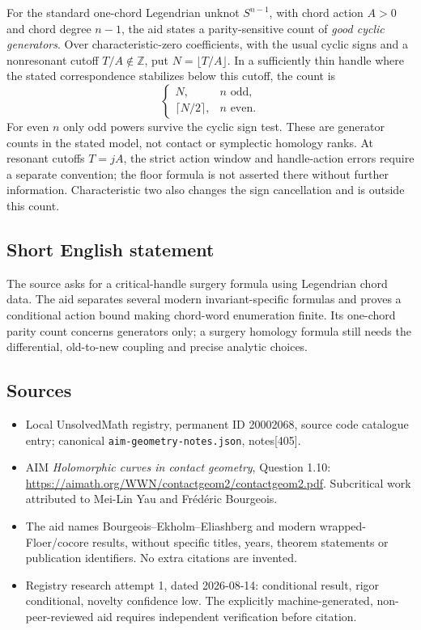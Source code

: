 \documentclass[11pt]{article}
\newcommand{\Z}{\mathbb{Z}}
\begin{document}
For the standard one-chord Legendrian unknot $S^{n-1}$, with chord action $A>0$ and chord degree $n-1$, the aid states a parity-sensitive count of \emph{good cyclic generators}. Over characteristic-zero coefficients, with the usual cyclic signs and a nonresonant cutoff $T/A\notin\Z$, put $N=\lfloor T/A\rfloor$. In a sufficiently thin handle where the stated correspondence stabilizes below this cutoff, the count is
\[
 \begin{cases}
 N,&n\text{ odd},\\
 \lceil N/2\rceil,&n\text{ even}.
 \end{cases}
\]
For even $n$ only odd powers survive the cyclic sign test. These are generator counts in the stated model, not contact or symplectic homology ranks. At resonant cutoffs $T=jA$, the strict action window and handle-action errors require a separate convention; the floor formula is not asserted there without further information. Characteristic two also changes the sign cancellation and is outside this count.
\subsection{Short English statement}
The source asks for a critical-handle surgery formula using Legendrian chord data. The aid separates several modern invariant-specific formulas and proves a conditional action bound making chord-word enumeration finite. Its one-chord parity count concerns generators only; a surgery homology formula still needs the differential, old-to-new coupling and precise analytic choices.
\subsection{Sources}
\begin{itemize}
\item Local UnsolvedMath registry, permanent ID 20002068, source code catalogue entry; canonical \texttt{aim-geometry-notes.json}, notes[405].
\item AIM \emph{Holomorphic curves in contact geometry}, Question 1.10: \url{https://aimath.org/WWN/contactgeom2/contactgeom2.pdf}. Subcritical work attributed to Mei-Lin Yau and Fr\'ed\'eric Bourgeois.
\item The aid names Bourgeois--Ekholm--Eliashberg and modern wrapped-Floer/cocore results, without specific titles, years, theorem statements or publication identifiers. No extra citations are invented.
\item Registry research attempt 1, dated 2026-08-14: conditional result, rigor conditional, novelty confidence low. The explicitly machine-generated, non-peer-reviewed aid requires independent verification before citation.
\end{itemize}
\end{document}
